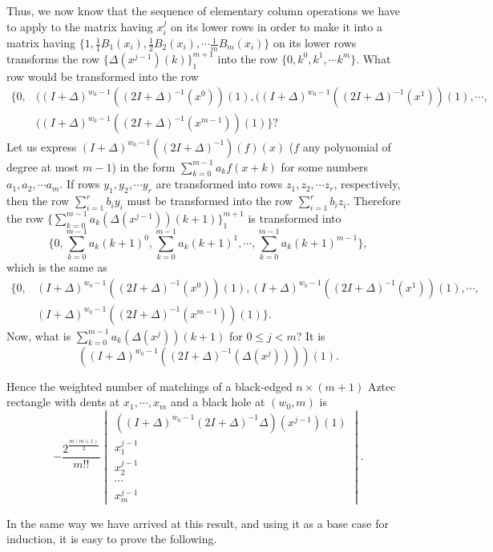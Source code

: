 \documentclass[10pt,reqno]{amsart}
\theoremstyle{plain}
\theoremstyle{definition}
\theoremstyle{remark}
\begin{document}
Thus, we now know that the sequence of elementary column operations
we have to apply to the matrix having $x_i^j$ on its lower rows in order
to make it into a matrix having 
$\{1,\frac{1}{1} B_1(x_i),\frac{1}{2} B_2(x_i),\dotsb \frac{1}{m} B_m(x_i)\}$
on its lower rows transforms the row $\{\Delta(x^{j-1})(k)\}_1^{m+1}$ into the 
row $\{0,k^0,k^1,\dotsb k^m\}$. What row would be transformed into the
row 
\[
\begin{aligned}
\{0,&((I+\Delta)^{w_0-1}((2I+\Delta)^{-1}(x^0))(1),
((I+\Delta)^{w_0-1}((2I+\Delta)^{-1}(x^1))(1),\dotsb ,\\
&((I+\Delta)^{w_0-1}((2I+\Delta)^{-1}(x^{m-1}))(1)\}?
\end{aligned}\]
Let us express $(I+\Delta)^{w_0-1}((2I+\Delta)^{-1})(f)(x)$ 
($f$ any polynomial of degree at most $m-1$) 
in the form $\sum_{k=0}^{m-1} a_k f(x+k)$ for some numbers 
$a_1,a_2,\dotsb a_m$. If rows $y_1,y_2,\dotsb y_r$ are transformed into rows
$z_1,z_2,\dotsb z_r$, respectively, then the row $\sum_{i=1}^r b_i y_i$
must be transformed into the row $\sum_{i=1}^r b_i z_i$. Therefore the
row $\{\sum_{k=0}^{m-1} a_k (\Delta(x^{j-1}))(k+1)\}_1^{m+1}$ is transformed
into 
\[\{ 0,\sum_{k=0}^{m-1} a_k (k+1)^0,\sum_{k=0}^{m-1} a_k (k+1)^1,\dotsb ,
\sum_{k=0}^{m-1} a_k (k+1)^{m-1}\},\]
which is the same as
\[
\begin{aligned}
\{0, &(I+\Delta)^{w_0-1}((2I+\Delta)^{-1}(x^0))(1),
(I+\Delta)^{w_0-1}((2I+\Delta)^{-1}(x^1))(1),\dotsb ,\\
&(I+\Delta)^{w_0-1}((2I+\Delta)^{-1}(x^{m-1}))(1)\}.
\end{aligned}
\]
Now, what is $\sum_{k=0}^{m-1} a_k (\Delta(x^j))(k+1)$ for $0\leq j<m$?
It is 
\[((I+\Delta)^{w_0-1}((2I+\Delta)^{-1}(\Delta(x^j))))(1).\]

Hence the weighted number of matchings of a black-edged $n\times (m+1)$ Aztec 
rectangle with dents at $x_1,\dotsb, x_m$ and a black hole at $(w_0,m)$ is
\begin{equation}
-\frac{2^{\frac{m(m+1)}{2}}}{m!!}
\begin{vmatrix}
((I+\Delta)^{w_0-1}(2I+\Delta)^{-1}\Delta)(x^{j-1})(1)\\
x_1^{j-1}\\
x_2^{j-1}\\
\dotsb \\
x_m^{j-1}
\end{vmatrix}. \label{eq:9}
\end{equation}

In the same way we have arrived at this result, and using it as a base 
case for induction, it is easy to prove the following.
\end{document}
